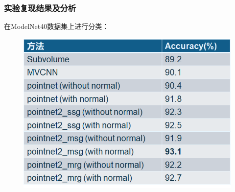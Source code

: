 \begin{frame}
  \frametitle{实验复现结果及分析}

在ModelNet40数据集上进行分类：

\begin{figure}
\includegraphics[scale=0.35]{doc/img/t1.png}
\end{figure}



\end{frame}


